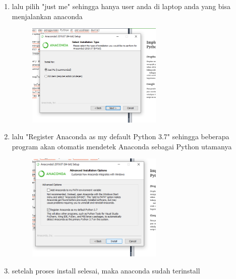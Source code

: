 \begin{enumerate}
    \item lalu pilih "just me" sehingga hanya user anda di laptop anda yang bisa menjalankan anaconda 
	\begin{figure} [h]
	\includegraphics[width=6.5cm]{section/picpyt/pyt4.png}
	\centering
	\end{figure}
	
	\item lalu "Register Anaconda as my default Python 3.7" sehingga beberapa program akan otomatis mendetek Anaconda sebagai Python utamanya
	\begin{figure} [h]
	\includegraphics[width=6.5cm]{section/picpyt/pyt5.png}
	\centering
	\end{figure}
	
	\item setelah proses install selesai, maka anaconda sudah terinstall

	

	\end{enumerate}
	
	

